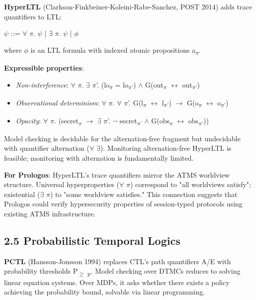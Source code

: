 \documentclass[11pt]{article}
\begin{document}
\textbf{HyperLTL} (Clarkson-Finkbeiner-Koleini-Rabe-Sanchez, POST 2014) adds trace
quantifiers to LTL:

\(\psi\) ::= \(\forall\) \(\pi\). \(\psi\) | \(\exists\) \(\pi\). \(\psi\) | \(\phi\)

where \(\phi\) is an LTL formula with indexed atomic propositions a\textsubscript{\(\pi\)}.

\textbf{Expressible properties}:
\begin{itemize}
\item \emph{Non-interference}: \(\forall\) \(\pi\). \(\exists\) \(\pi\)'. (lo\textsubscript{\(\pi\)} = lo\textsubscript{\(\pi\)'}) \(\land\) G(out\textsubscript{\(\pi\)} \(\leftrightarrow\) out\textsubscript{\(\pi\)'})
\item \emph{Observational determinism}: \(\forall\) \(\pi\). \(\forall\) \(\pi\)'. G(l\textsubscript{\(\pi\)} \(\leftrightarrow\) l\textsubscript{\(\pi\)'}) \(\to\) G(o\textsubscript{\(\pi\)} \(\leftrightarrow\) o\textsubscript{\(\pi\)'})
\item \emph{Opacity}: \(\forall\) \(\pi\). (secret\textsubscript{\(\pi\)} \(\to\) \(\exists\) \(\pi\)'. \(\neg{}\) secret\textsubscript{\(\pi\)'} \(\land\) G(obs\textsubscript{\(\pi\)} \(\leftrightarrow\) obs\textsubscript{\(\pi\)'}))
\end{itemize}

Model checking is decidable for the alternation-free fragment but undecidable
with quantifier alternation (\(\forall\) \(\exists\)). Monitoring alternation-free HyperLTL
is feasible; monitoring with alternation is fundamentally limited.

\textbf{For Prologos}: HyperLTL's trace quantifiers mirror the ATMS worldview
structure. Universal hyperproperties (\(\forall\) \(\pi\)) correspond to "all worldviews
satisfy"; existential (\(\exists\) \(\pi\)) to "some worldview satisfies." This
connection suggests that Prologos could verify hypersecurity properties of
session-typed protocols using existing ATMS infrastructure.
\subsection{2.5 Probabilistic Temporal Logics}
\label{sec:org574f917}

\textbf{PCTL} (Hansson-Jonsson 1994) replaces CTL's path quantifiers A/E with
probability thresholds P\textsubscript{\(\ge\) p}. Model checking over DTMCs reduces to
solving linear equation systems. Over MDPs, it asks whether there exists a
policy achieving the probability bound, solvable via linear programming.
\end{document}
